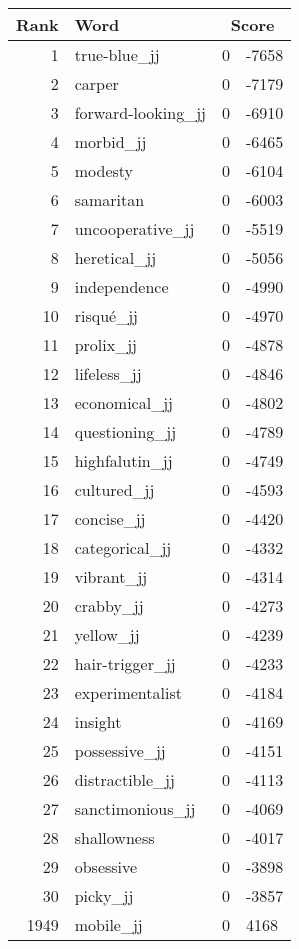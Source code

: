 \begin{longtable}[!htbp]{| rlr@{.}l |}
    \hline
    \textbf{Rank} & \textbf{Word} & \multicolumn{2}{c|}{\textbf{Score}} \\
    \hline
    \endhead
    1 & true-blue\_jj & 0 & -7658 \\
    2 & carper & 0 & -7179 \\
    3 & forward-looking\_jj & 0 & -6910 \\
    4 & morbid\_jj & 0 & -6465 \\
    5 & modesty & 0 & -6104 \\
    6 & samaritan & 0 & -6003 \\
    7 & uncooperative\_jj & 0 & -5519 \\
    8 & heretical\_jj & 0 & -5056 \\
    9 & independence & 0 & -4990 \\
    10 & risqué\_jj & 0 & -4970 \\
    11 & prolix\_jj & 0 & -4878 \\
    12 & lifeless\_jj & 0 & -4846 \\
    13 & economical\_jj & 0 & -4802 \\
    14 & questioning\_jj & 0 & -4789 \\
    15 & highfalutin\_jj & 0 & -4749 \\
    16 & cultured\_jj & 0 & -4593 \\
    17 & concise\_jj & 0 & -4420 \\
    18 & categorical\_jj & 0 & -4332 \\
    19 & vibrant\_jj & 0 & -4314 \\
    20 & crabby\_jj & 0 & -4273 \\
    21 & yellow\_jj & 0 & -4239 \\
    22 & hair-trigger\_jj & 0 & -4233 \\
    23 & experimentalist & 0 & -4184 \\
    24 & insight & 0 & -4169 \\
    25 & possessive\_jj & 0 & -4151 \\
    26 & distractible\_jj & 0 & -4113 \\
    27 & sanctimonious\_jj & 0 & -4069 \\
    28 & shallowness & 0 & -4017 \\
    29 & obsessive & 0 & -3898 \\
    30 & picky\_jj & 0 & -3857 \\
    1949 & mobile\_jj & 0 & 4168 \\

\end{longtable}
